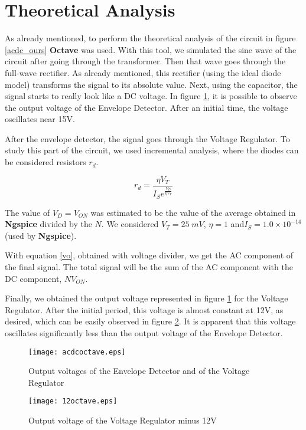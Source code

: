 \newpage
\section{Theoretical Analysis}
\label{sec:analysis}

As already mentioned, to perform the theoretical analysis of the circuit in figure \ref{acdc_ours} {\bf Octave} was used. With this tool, we simulated the sine wave of the circuit after going through the transformer. Then that wave goes through the full-wave rectifier. As already mentioned, this rectifier (using the ideal diode model) transforms the signal to its absolute value. Next, using the capacitor, the signal starts to really look like a DC voltage. In figure \ref{fig:acdcoc}, it is possible to observe the output voltage of the Envelope Detector. After an initial time, the voltage oscillates near 15V.

After the envelope detector, the signal goes through the Voltage Regulator. To study this part of the circuit, we used incremental analysis, where the diodes can be considered resistors $r_d$.

\begin{equation}
        r_d = \frac{\eta V_T}{I_Se^{\frac{V_D}{\eta V_T}}}
        \label{rd}
\end{equation}

The value of $V_D = V_{ON}$ was estimated to be the value of the average obtained in {\bf Ngspice} divided by the $N$. We considered $V_T=25\;mV$, $\eta = 1$ and$I_S = 1.0 \times 10^{-14}$ (used by {\bf Ngspice}).

With equation \ref{vo}, obtained with voltage divider, we get the AC component of the final signal. The total signal will be the sum of the AC component with the DC component, $N V_{ON}$.

Finally, we obtained the output voltage represented in figure \ref{fig:acdcoc} for the Voltage Regulator. After the initial period, this voltage is almost constant at 12V, as desired, which can be easily observed in figure \ref{fig:vo-12}. It is apparent that this voltage oscillates significantly less than the output voltage of the Envelope Detector.


\begin{figure}[H]
  \centering
  \texttt{[image: acdcoctave.eps]}
  \caption{Output voltages of the Envelope Detector and of the Voltage Regulator}
  \label{fig:acdcoc}
\end{figure}

\begin{figure}[H]
  \centering
  \texttt{[image: 12octave.eps]}
  \caption{Output voltage of the Voltage Regulator minus 12V}
  \label{fig:vo-12}
\end{figure}
